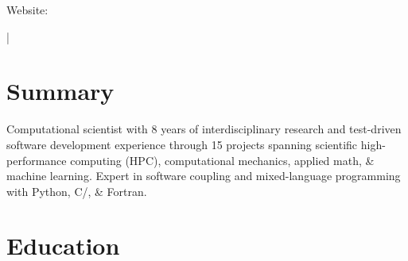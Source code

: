 \documentclass[letterpaper,10pt]{article}
\begin{document}

      \href{\AuthorWebsiteLink}{\scshape\huge\Author}\vspace{2pt}

    \begin{small}
      Website: \href{\AuthorWebsiteLink}{\AuthorWebsiteText}

      \vspace{2pt}\AuthorAddress

      \vspace{2pt}\href{mailto:\AuthorEmail}{\AuthorEmail} |
      \href{\AuthorPhoneLink}{\AuthorPhoneText}

    \end{small}

\section{Summary}
\vspace{-2pt}
Computational scientist with 8 years of interdisciplinary research and
test-driven software development experience through 15\smallplus{} projects
spanning scientific high-performance computing (HPC), computational mechanics,
applied math, \& machine learning. Expert in software coupling
and mixed-language programming with Python, C/\CC{}, \&
Fortran.

\section{Education}
  \resumeSubHeadingListStart
\end{document}
